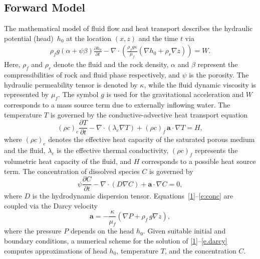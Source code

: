 \documentclass[12pt, oneside]{book}
\begin{document}
\subsection{Forward Model}
The mathematical model of fluid flow and heat transport describes the hydraulic potential
(head)~$h_0$ at the location $(x,z)$ and the time $t$ via
\begin{multline}\label{1}
     \rho_f g (\alpha+\psi\beta)\frac{\partial h_0}{\partial t}
   - \nabla \cdot\left(\frac{\rho_f g \kappa}{\mu_f}(\nabla h_0 + \rho_r \nabla z) \right)= W .
\end{multline}
Here, $\rho_f$ and $\rho_r$ denote the fluid and the rock density, $\alpha$ and $\beta$ represent
the compressibilities of rock and fluid phase respectively, and $\psi$ is the porosity. The
hydraulic permeability tensor is denoted by $\kappa$, while the fluid dynamic viscosity is
represented by $\mu_f$. The symbol $g$ is used for the gravitational acceleration and $W$
corresponds to a mass source term due to externally inflowing water.
%
The temperature $T$ is governed by the conductive-advective heat transport equation
\begin{equation}\label{4}
 (\rho c)_e\frac{\partial T}{\partial t}
 - \nabla \cdot (\lambda_e \nabla T)
 + (\rho c)_f \, \mathbf{a} \cdot \nabla T = H,
\end{equation}
where $(\rho c)_e$ denotes the effective heat capacity of the saturated porous medium and the
fluid, $\lambda_e$ is the effective thermal conductivity, $(\rho c)_f$ represents the volumetric
heat capacity of the fluid, and $H$ corresponds to a possible heat source term.
%
The concentration of dissolved species $C$ is governed by
\begin{equation}\label{e:conc}
 \psi \frac{\partial C}{\partial t}
 - \nabla \cdot (D \nabla C)
 + \mathbf{a} \cdot \nabla C = 0,
\end{equation}
where $D$ is the hydrodynamic dispersion tensor.
%
Equations~\eqref{1}--\eqref{e:conc} are coupled via the Darcy velocity
\begin{equation}\label{e.darcy}
\mathbf{a} = - \frac{\kappa}{\mu_f}(\nabla P + \rho_f \, g\nabla z),
\end{equation}
where the pressure $P$ depends on the head $h_0$. Given suitable initial and boundary conditions, a
numerical scheme for the solution of \eqref{1}--\eqref{e.darcy} computes approximations of head
$h_0$, temperature $T$, and the concentration $C$.
\end{document}
